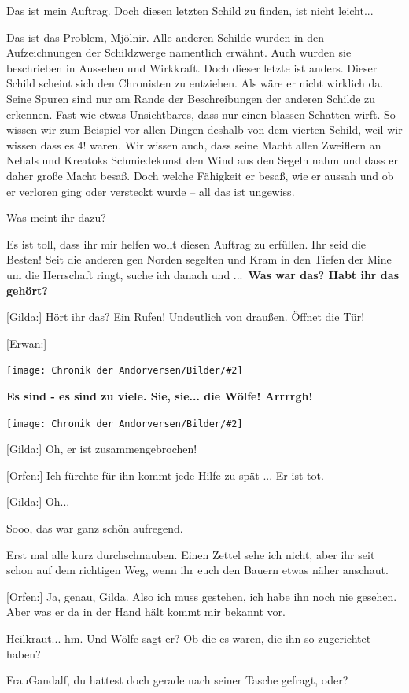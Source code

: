 \documentclass[10pt, a4paper, oneside]{book}
\newcommand{\bildmitts}[2][height=0.32\textwidth,width=0.48\textwidth,keepaspectratio]{%
    \begin{center}
        \texttt{[image: Chronik der Andorversen/Bilder/\#2]}
    \end{center}
}
\begin{document}
\begin{multicols}{2}
Das ist mein Auftrag. Doch diesen letzten Schild zu finden, ist nicht leicht...

Das ist das Problem, Mjölnir. Alle anderen Schilde wurden in den Aufzeichnungen der Schildzwerge namentlich erwähnt. Auch wurden sie beschrieben in Aussehen und Wirkkraft. Doch dieser letzte ist anders. Dieser Schild scheint sich den Chronisten zu entziehen. Als wäre er nicht wirklich da. Seine Spuren sind nur am Rande der Beschreibungen der anderen Schilde zu erkennen. Fast wie etwas Unsichtbares, dass nur einen blassen Schatten wirft. So wissen wir zum Beispiel vor allen Dingen deshalb von dem vierten Schild, weil wir wissen dass es 4! waren. Wir wissen auch, dass seine Macht allen Zweiflern an Nehals und Kreatoks Schmiedekunst den Wind aus den Segeln nahm und dass er daher große Macht besaß. Doch welche Fähigkeit er besaß, wie er aussah und ob er verloren ging oder versteckt wurde – all das ist ungewiss.

Was meint ihr dazu?

Es ist toll, dass ihr mir helfen wollt diesen Auftrag zu erfüllen. Ihr seid die Besten!
Seit die anderen gen Norden segelten und Kram in den Tiefen der Mine um die Herrschaft ringt, suche ich danach und ... \textbf{Was war das? Habt ihr das gehört?}

[Gilda:] Hört ihr das? Ein Rufen! Undeutlich von draußen. Öffnet die Tür!

[Erwan:] 

\bildmitts{AA2015 Der Auftrag 2.jpeg}

\textbf{Es sind - es sind zu viele. Sie, sie... die Wölfe! Arrrrgh!}

\bildmitts{AA2015 Der Auftrag 3.jpeg}

[Gilda:] Oh, er ist zusammengebrochen!

[Orfen:] Ich fürchte für ihn kommt jede Hilfe zu spät ... Er ist tot.

[Gilda:] Oh...

Sooo, das war ganz schön aufregend.

Erst mal alle kurz durchschnauben. Einen Zettel sehe ich nicht, aber ihr seit schon auf dem richtigen Weg, wenn ihr euch den Bauern etwas näher anschaut.

[Orfen:] Ja, genau, Gilda. Also ich muss gestehen, ich habe ihn noch nie gesehen. Aber was er da in der Hand hält kommt mir bekannt vor.

Heilkraut... hm. Und Wölfe sagt er? Ob die es waren, die ihn so zugerichtet haben?

FrauGandalf, du hattest doch gerade nach seiner Tasche gefragt, oder?


\end{multicols}
\end{document}
